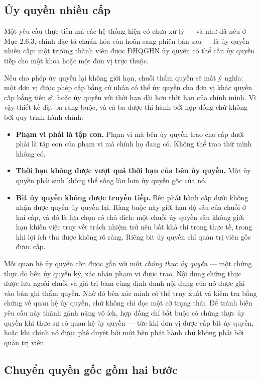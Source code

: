 \subsection{Ủy quyền nhiều cấp}

Một yêu cầu thực tiễn mà các hệ thống hiện có chưa xử lý --- và như đã nêu ở Mục 2.6.3, chính đặc tả chuẩn hóa còn hoãn sang phiên bản sau --- là ủy quyền nhiều cấp: một trường thành viên được ĐHQGHN ủy quyền có thể cần ủy quyền tiếp cho một khoa hoặc một đơn vị trực thuộc.

Nếu cho phép ủy quyền lại không giới hạn, chuỗi thẩm quyền sẽ mất ý nghĩa: một đơn vị được phép cấp bằng cử nhân có thể ủy quyền cho đơn vị khác quyền cấp bằng tiến sĩ, hoặc ủy quyền với thời hạn dài hơn thời hạn của chính mình. Vì vậy thiết kế đặt ba ràng buộc, và cả ba được thi hành bởi hợp đồng chứ không bởi quy trình hành chính:

\begin{itemize}
    \item \textbf{Phạm vi phải là tập con.} Phạm vi mà bên ủy quyền trao cho cấp dưới phải là tập con của phạm vi mà chính họ đang có. Không thể trao thứ mình không có.
    \item \textbf{Thời hạn không được vượt quá thời hạn của bên ủy quyền.} Một ủy quyền phái sinh không thể sống lâu hơn ủy quyền gốc của nó.
    \item \textbf{Bit ủy quyền không được truyền tiếp.} Bên phát hành cấp dưới không nhận được quyền ủy quyền lại. Ràng buộc này giới hạn độ sâu của chuỗi ở hai cấp, và đó là lựa chọn có chủ đích: một chuỗi ủy quyền sâu không giới hạn khiến việc truy vết trách nhiệm trở nên bất khả thi trong thực tế, trong khi lợi ích thu được không rõ ràng. Riêng bit ủy quyền chỉ quản trị viên gốc được cấp.
\end{itemize}

Mỗi quan hệ ủy quyền còn được gắn với một \emph{chứng thực ủy quyền} --- một chứng thực do bên ủy quyền ký, xác nhận phạm vi được trao. Nội dung chứng thực được lưu ngoài chuỗi và giá trị băm cùng định danh nội dung của nó được ghi vào bản ghi thẩm quyền. Nhờ đó bên xác minh có thể truy xuất và kiểm tra bằng chứng về quan hệ ủy quyền, chứ không chỉ đọc một cờ trạng thái. Để tránh biến yêu cầu này thành gánh nặng vô ích, hợp đồng chỉ bắt buộc có chứng thực ủy quyền khi thực sự có quan hệ ủy quyền --- tức khi đơn vị được cấp bit ủy quyền, hoặc khi chính nó được phê duyệt bởi một bên phát hành chứ không phải bởi quản trị viên.

\subsection{Chuyển quyền gốc gồm hai bước}

